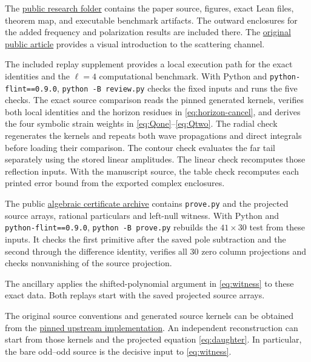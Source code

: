 \documentclass[11pt]{article}
\begin{document}
The \href{https://github.com/agentsidequests/aptifold-lean-proofs/tree/main/research/schwarzschild-quadratic-scattering}{public research folder} contains the paper source, figures, exact Lean files, theorem map, and executable benchmark artifacts. The outward enclosures for the added frequency and polarization results are included there. The \href{https://aptifold.ai/gw-physics}{original public article} provides a visual introduction to the scattering channel.

The included replay supplement provides a local execution path for the exact identities and the \(\ell=4\) computational benchmark.
With Python and \texttt{python-flint==0.9.0}, \texttt{python -B review.py} checks the fixed inputs and runs the five checks.
The exact source comparison reads the pinned generated kernels, verifies both local identities and the horizon residues in \eqref{eq:horizon-cancel}, and derives the four symbolic strain weights in \eqref{eq:Qone}--\eqref{eq:Qtwo}.
The radial check regenerates the kernels and repeats both wave propagations and direct integrals before loading their comparison.
The contour check evaluates the far tail separately using the stored linear amplitudes.
The linear check recomputes those reflection inputs.
With the manuscript source, the table check recomputes each printed error bound from the exported complex enclosures.

The public \href{https://aptifold.ai/assets/research/gw-replay.zip}{algebraic certificate archive}
contains \texttt{prove.py} and the projected source arrays, rational particulars and left-null witness.
With Python and \texttt{python-flint==0.9.0}, \texttt{python -B prove.py}
rebuilds the \(41\times30\) test from these inputs.
It checks the first primitive after the saved pole subtraction and the second through the difference identity, verifies all 30 zero column projections and checks nonvanishing of the source projection.

The ancillary  applies the shifted-polynomial argument in \eqref{eq:witness} to these exact data.
Both replays start with the saved projected source arrays.

The original source conventions and generated source kernels can be obtained from the
\href{https://github.com/jredondoyuste/BlackHoleNonlinearities.jl/tree/5831ae75e20b31489ef2034c8bbb13a53c5d4a3d}{pinned upstream implementation}.
An independent reconstruction can start from those kernels and the projected equation \eqref{eq:daughter}.
In particular, the bare odd--odd source is the decisive input to \eqref{eq:witness}.
\end{document}
